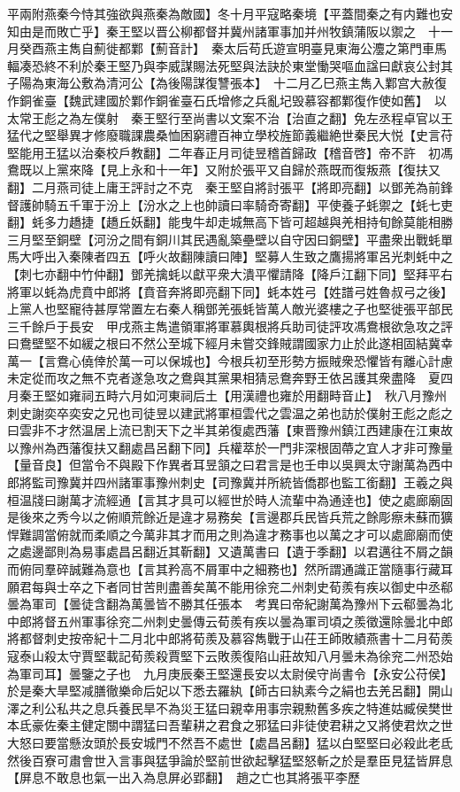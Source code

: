 平兩附燕秦今恃其強欲與燕秦為敵國】冬十月平寇略秦境【平蓋間秦之有内難也安知由是而敗亡乎】秦王堅以晋公柳都督并冀州諸軍事加并州牧鎮蒲阪以禦之　十一月癸酉燕主雋自薊徙都鄴【薊音計】　秦太后苟氏遊宣明臺見東海公灋之第門車馬輻凑恐終不利於秦王堅乃與李威謀賜法死堅與法訣於東堂慟哭嘔血諡曰獻哀公封其子陽為東海公敷為清河公【為後陽謀復讐張本】　十二月乙巳燕主雋入鄴宫大赦復作銅雀臺【魏武建國於鄴作銅雀臺石氏增修之兵亂圮毁慕容都鄴復作使如舊】　以太常王彪之為左僕射　秦王堅行至尚書以文案不治【治直之翻】免左丞程卓官以王猛代之堅舉異才修廢職課農桑恤困窮禮百神立學校旌節義繼絶世秦民大悦【史言苻堅能用王猛以治秦校戶教翻】二年春正月司徒昱稽首歸政【稽音啓】帝不許　初馮鴦既以上黨來降【見上永和十一年】又附於張平又自歸於燕既而復叛燕【復扶又翻】二月燕司徒上庸王評討之不克　秦王堅自將討張平【將即亮翻】以鄧羌為前鋒督護帥騎五千軍于汾上【汾水之上也帥讀曰率騎奇寄翻】平使養子蚝禦之【蚝七吏翻】蚝多力趫捷【趫丘妖翻】能曳牛却走城無高下皆可超越與羌相持旬餘莫能相勝三月堅至銅壁【河汾之間有銅川其民遇亂築壘壁以自守因曰銅壁】平盡衆出戰蚝單馬大呼出入秦陳者四五【呼火故翻陳讀曰陣】堅募人生致之鷹揚將軍呂光刺蚝中之【刺七亦翻中竹仲翻】鄧羌擒蚝以獻平衆大潰平懼請降【降戶江翻下同】堅拜平右將軍以蚝為虎賁中郎將【賁音奔將即亮翻下同】蚝本姓弓【姓譜弓姓魯叔弓之後】上黨人也堅寵待甚厚常置左右秦人稱鄧羌張蚝皆萬人敵光婆樓之子也堅徙張平部民三千餘戶于長安　甲戌燕主雋遣領軍將軍慕輿根將兵助司徒評攻馮鴦根欲急攻之評曰鴦壁堅不如緩之根曰不然公至城下經月未嘗交鋒賊謂國家力止於此遂相固結冀幸萬一【言鴦心僥倖於萬一可以保城也】今根兵初至形勢方振賊衆恐懼皆有離心計慮未定從而攻之無不克者遂急攻之鴦與其黨果相猜忌鴦奔野王依呂護其衆盡降　夏四月秦王堅如雍祠五畤六月如河東祠后土【用漢禮也雍於用翻畤音止】　秋八月豫州刺史謝奕卒奕安之兄也司徒昱以建武將軍桓雲代之雲温之弟也訪於僕射王彪之彪之曰雲非不才然温居上流已割天下之半其弟復處西藩【東晋豫州鎮江西建康在江東故以豫州為西藩復扶又翻處昌呂翻下同】兵權萃於一門非深根固蔕之宜人才非可豫量【量音良】但當令不與殿下作異者耳昱頷之曰君言是也壬申以吳興太守謝萬為西中郎將監司豫冀并四州諸軍事豫州刺史【司豫冀并所統皆僑郡也監工銜翻】王羲之與桓温牋曰謝萬才流經通【言其才具可以經世於時人流輩中為通逹也】使之處廊廟固是後來之秀今以之俯順荒餘近是違才易務矣【言邊郡兵民皆兵荒之餘彫瘵未蘇而獷悍難調當俯就而柔順之今萬非其才而用之則為違才務事也以萬之才可以處廊廟而使之處邊鄙則為易事處昌呂翻近其靳翻】又遺萬書曰【遺于季翻】以君邁往不屑之韻而俯同羣碎誠難為意也【言其矜高不屑軍中之細務也】然所謂通識正當隨事行藏耳願君每與士卒之下者同甘苦則盡善矣萬不能用徐兖二州刺史荀羨有疾以御史中丞郗曇為軍司【曇徒含翻為萬曇皆不勝其任張本　考異曰帝紀謝萬為豫州下云郗曇為北中郎將督五州軍事徐兖二州刺史曇傳云荀羨有疾以曇為軍司頃之羨徵還除曇北中郎將都督刺史按帝紀十二月北中郎將荀羨及慕容雋戰于山茌王師敗績燕書十二月荀羨寇泰山殺太守賈堅載記荀羨殺賈堅下云敗羨復陷山莊故知八月曇未為徐兖二州恐始為軍司耳】曇鑒之子也　九月庚辰秦王堅還長安以太尉侯守尚書令【永安公苻侯】於是秦大旱堅减膳徹樂命后妃以下悉去羅紈【師古曰紈素今之絹也去羌呂翻】開山澤之利公私共之息兵養民旱不為災王猛曰親幸用事宗親勲舊多疾之特進姑臧侯樊世本氐豪佐秦主健定關中謂猛曰吾輩耕之君食之邪猛曰非徒使君耕之又將使君炊之世大怒曰要當懸汝頭於長安城門不然吾不處世【處昌呂翻】猛以白堅堅曰必殺此老氐然後百寮可肅會世入言事與猛爭論於堅前世欲起擊猛堅怒斬之於是羣臣見猛皆屛息【屏息不敢息也氣一出入為息屏必郢翻】　趙之亡也其將張平李歷